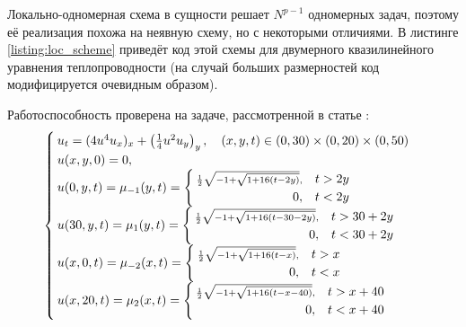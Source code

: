 Локально-одномерная схема в сущности решает $N^{p - 1}$ одномерных задач, поэтому её реализация похожа на неявную схему, но с некоторыми отличиями.
В листинге \ref{listing:loc_scheme} приведёт код этой схемы для двумерного квазилинейного уравнения теплопроводности (на случай больших размерностей код модифицируется очевидным образом).

Работоспособность проверена на задаче, рассмотренной в статье \cite{самарский1963примеры}:
\begin{equation}\label{eq:problem_3}
    \textstyle
    \begin{cases}
        u_t = (4u^4 u_x)_x + \left( \frac{1}{4} u^2 u_y \right)_y, \quad (x, y, t) \in (0, 30) \times (0, 20) \times (0, 50)\\
        u(x, y, 0) = 0,\\
        u(0, y, t) = \mu_{-1}(y, t) = \begin{cases}
            \scriptstyle\frac{1}{2}\sqrt{-1 + \sqrt{1 + 16(t - 2y)}}, & t > 2y\\
            \hfill 0, & t < 2y
        \end{cases}\\
        u(30, y, t) = \mu_1(y, t) = \begin{cases}
            \scriptstyle\frac{1}{2}\sqrt{-1 + \sqrt{1 + 16(t - 30 - 2y)}}, & t > 30 + 2y\\
            \hfill 0, & t < 30 + 2y
        \end{cases}\\
        u(x, 0, t) = \mu_{-2}(x, t) = \begin{cases}
            \scriptstyle\frac{1}{2}\sqrt{-1 + \sqrt{1 + 16(t - x)}}, & t > x\\
            \hfill 0, & t < x
        \end{cases}\\
        u(x, 20, t) = \mu_2(x, t) = \begin{cases}
            \scriptstyle\frac{1}{2}\sqrt{-1 + \sqrt{1 + 16(t - x - 40)}}, & t > x + 40\\
            \hfill 0, & t < x + 40
        \end{cases}
    \end{cases}
\end{equation}

